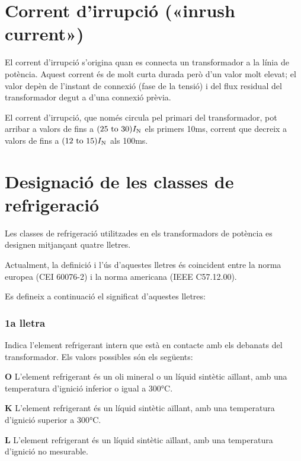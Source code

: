 \section{Corrent d'irrupció («inrush current»)}

El corrent d'irrupció s'origina quan es  connecta un transformador a la línia de potència. Aquest corrent és de molt curta durada però d'un valor molt elevat; el valor depèn de l'instant de connexió (fase de la tensió) i del flux residual del transformador degut a d'una connexió prèvia.

El corrent d'irrupció, que només circula pel primari del transformador, pot arribar a valors de fins a $(\numrange{25}{30}) I\ped{N}$ els primers 10\unit{ms}, corrent que decreix a valors de fins  a $(\numrange{12}{15}) I\ped{N}$ als 100\unit{ms}.

\section{Designació de les classes de refrigeració}\label{sec:trafos-pot-refrig}
 

Les classes de refrigeració utilitzades en els transformadors de
potència es designen mitjançant quatre lletres.

Actualment, la definició i l'ús d'aquestes lletres és coincident
entre la norma europea (CEI 60076-2) i la norma americana
(IEEE C57.12.00).

Es defineix a continuació el significat d'aquestes lletres:

\subsubsection*{1a lletra}
Indica l'element refrigerant intern que està en
contacte amb els debanats del transformador. Els valors possibles
són els següents:

\begin{list}{}
   {\setlength{\labelwidth}{10mm} \setlength{\leftmargin}{10mm} \setlength{\labelsep}{2mm}}
   \item[\textbf{O}] L'element refrigerant és un oli mineral o un líquid sintètic aïllant, amb una temperatura d'ignició
   inferior o igual a 300\unit{\celsius}.
   \item[\textbf{K}] L'element refrigerant és un líquid sintètic aïllant, amb una temperatura d'ignició
   superior a 300\unit{\celsius}.
   \item[\textbf{L}] L'element refrigerant és un líquid sintètic aïllant, amb una temperatura d'ignició
   no mesurable.
\end{list}
  

